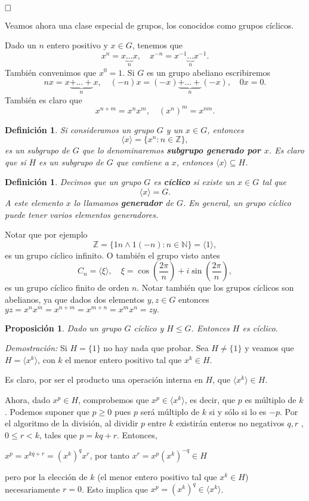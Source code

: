 \documentclass[12pt]{article}
\newtheorem{proposition}[theorem]{Proposición}
\newtheorem{definition}[theorem]{Definición}
\begin{document}
$\hfill \square$

Veamos ahora una clase especial de grupos, los conocidos como grupos cíclicos. 

Dado un $n$ entero positivo y $x\in G$, tenemos que $$x^n = x\underbrace{\ldots}_{n} x, \quad x^{-n} = x^{-1} \underbrace{\ldots}_n x^{-1}.$$ También convenimos que $x^0 = 1$. Si $G$ es un grupo abeliano escribiremos $$nx = x\underbrace{+\ldots +}_n x, \quad (-n)x=(-x)\underbrace{+\ldots +}_n(-x), \quad 0x = 0.$$ También es claro que $$x^{n+m} = x^nx^m, \quad (x^n)^m=x^{nm}.$$

\begin{definition}Si consideramos un grupo $G$ y un $x\in G$, entonces $$\langle x \rangle = \lbrace x^n:n \in \mathbb{Z} \rbrace,$$ es un subgrupo de $G$ que lo denominaremos \textbf{subgrupo generado por $x$}. Es claro que si $H$ es un subgrupo de $G$ que contiene a $x$, entonces $\langle x \rangle \subseteq H$.
\end{definition}

\begin{definition}Decimos que un grupo $G$ es \textbf{cíclico} si existe un $x \in G$ tal que $$\langle x \rangle = G.$$ A este elemento $x$ lo llamamos \textbf{generador} de $G$. En general, un grupo cíclico puede tener varios elementos generadores.
\end{definition}

Notar que por ejemplo $$\mathbb{Z} = \lbrace 1n \wedge 1(-n) :n \in \mathbb{N} \rbrace= \langle 1 \rangle,$$ es un grupo cíclico infinito. O también el grupo visto antes $$C_n = \langle \xi \rangle, \quad \xi = \cos\left(\dfrac{2\pi}{n}\right)+i\sin\left(\dfrac{2\pi}{n}\right),$$ es un grupo cíclico finito de orden $n$. Notar también que los grupos cíclicos son abelianos, ya que dados dos elementos $y,z \in G$ entonces $yz = x^nx^m=x^{n+m}=x^{m+n} = x^mx^n=zy.$

\begin{proposition}\label{eq:subciclico} Dado un grupo $G$ cíclico y $H \leq G$. Entonces $H$ es cíclico.
\end{proposition}
\emph{Demostración: } Si $H = \lbrace 1 \rbrace$ no hay nada que probar. Sea $H \neq \lbrace 1 \rbrace$ y veamos que $H = \langle x^{k} \rangle$, con $k$ el menor entero positivo tal que $x^{k} \in H$.

Es claro, por ser el producto una operación interna en $H$, que $\langle x^{k} \rangle \in H$.

Ahora, dado $x ^{p} \in H$, comprobemos que $x^{p} \in \langle x^{k} \rangle$, es decir, que $p$ es múltiplo de $k$. Podemos suponer que $p \geq 0$ pues $p$ será múltiplo de $k$ si y sólo si lo es $-p$. Por el algoritmo de la división, al dividir $p$ entre $k$ existirán enteros no negativos $q,r$ , $0 \leq r < k$, tales que $p = kq + r$. Entonces, 
\begin{center}
$x^{p} = x^{kq+r} = (x^{k})^{q}x^{r}$, por tanto $x^{r} = x^{p}(x^{k})^{-q} \in H$
\end{center}
pero por la elección de $k$ (el menor entero positivo tal que $x^{k} \in H$) necesariamente $r = 0$. Esto implica que $x^{p} = (x^{k})^{q} \in \langle x^{k} \rangle$.
\end{document}
